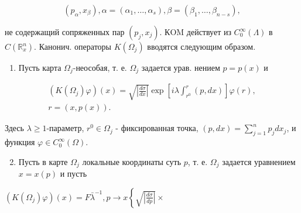 \documentclass[10pt]{article}
\begin{document}
\[

\left(p_{\alpha}, x_{\beta}\right), \alpha=\left(\alpha_{1}, \ldots, \alpha_{s}\right), \beta=\left(\beta_{1}, \ldots, \beta_{n-s}\right),

\]



не содержащий сопряженных пар $\left(p_{j}, x_{j}\right)$. КOM действует из $C_{0}^{\infty}(\Lambda)$ в $C\left(\mathbb{R}_{x}^{n}\right)$. Канонич. операторы $K\left(\Omega_{j}\right)$ вводятся следующим образом.



\begin{enumerate}

  \item Пусть карта $\Omega_{j}$-неособая, т. е. $\Omega_{j}$ задается урав. нением $p=p(x)$ и

\end{enumerate}



\[

\begin{gathered}

\left(K\left(\Omega_{j}\right) \varphi\right)(x)=\sqrt{\left|\frac{d \sigma}{d x}\right|} \exp \left[i \lambda \int_{r^{0}}^{r}(p, d x)\right] \varphi(r), \\

r=(x, p(x)) .

\end{gathered}

\]



Здесь $\lambda \geqslant 1$-параметр, $r^{0} \in \Omega_{j}$ - фиксированная точка, $(p, d x)=\sum_{j=1}^{n} p_{j} d x_{j}$, и функция $\varphi \in C_{0}^{\infty}(\Omega)$.



\begin{enumerate}

  \setcounter{enumi}{1}

  \item Пусть в карте $\Omega_{j}$ локальные координаты суть $p$, т. е. $\Omega_{j}$ задается уравнением $x=x(p)$ и пусть

\end{enumerate}



$\left(K\left(\Omega_{j}\right) \varphi\right)(x)=F \bar{\lambda}^{-1}, p \rightarrow x\left\{\sqrt{\left|\frac{d \sigma}{d p}\right|} \times\right.$
\end{document}
